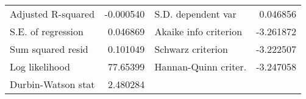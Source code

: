 \begin{tabular}{lrrrr}
\multicolumn{1}{l}{Adjusted R-squared}&\multicolumn{1}{r}{-0.000540}&\multicolumn{2}{l}{S.D. dependent var}&\multicolumn{1}{r}{0.046856}\\
\multicolumn{1}{l}{S.E. of regression}&\multicolumn{1}{r}{0.046869}&\multicolumn{2}{l}{Akaike info criterion}&\multicolumn{1}{r}{-3.261872}\\
\multicolumn{1}{l}{Sum squared resid}&\multicolumn{1}{r}{0.101049}&\multicolumn{2}{l}{Schwarz criterion}&\multicolumn{1}{r}{-3.222507}\\
\multicolumn{1}{l}{Log likelihood}&\multicolumn{1}{r}{77.65399}&\multicolumn{2}{l}{Hannan-Quinn criter.}&\multicolumn{1}{r}{-3.247058}\\
\multicolumn{1}{l}{Durbin-Watson stat}&\multicolumn{1}{r}{2.480284}&\multicolumn{1}{c}{}&\multicolumn{1}{c}{}&\multicolumn{1}{c}{}\\
\bottomrule
\end{tabular}